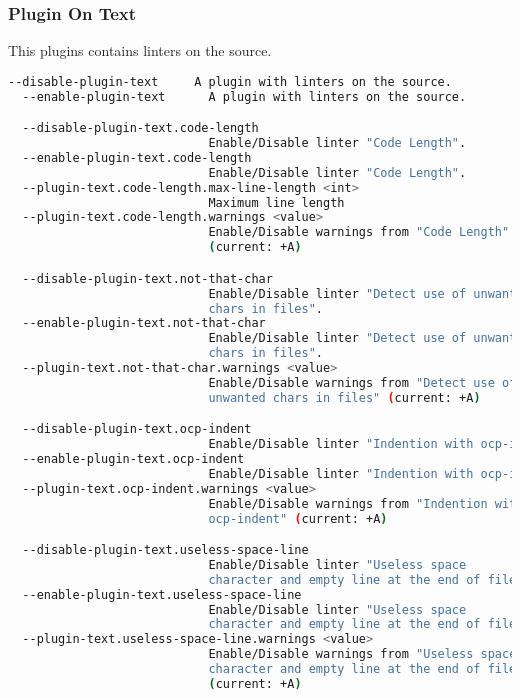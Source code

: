 \subsubsection*{Plugin On Text}
This plugins contains linters on the source.

\begin{lstlisting}[language=bash,basicstyle=\tt\small,showspaces=false,showstringspaces=false]
  --disable-plugin-text     A plugin with linters on the source.
  --enable-plugin-text      A plugin with linters on the source.

  --disable-plugin-text.code-length  
                            Enable/Disable linter "Code Length".
  --enable-plugin-text.code-length  
                            Enable/Disable linter "Code Length".
  --plugin-text.code-length.max-line-length <int> 
                            Maximum line length
  --plugin-text.code-length.warnings <value> 
                            Enable/Disable warnings from "Code Length" 
                            (current: +A)

  --disable-plugin-text.not-that-char  
                            Enable/Disable linter "Detect use of unwanted 
                            chars in files".
  --enable-plugin-text.not-that-char  
                            Enable/Disable linter "Detect use of unwanted 
                            chars in files".
  --plugin-text.not-that-char.warnings <value> 
                            Enable/Disable warnings from "Detect use of 
                            unwanted chars in files" (current: +A)

  --disable-plugin-text.ocp-indent  
                            Enable/Disable linter "Indention with ocp-indent".
  --enable-plugin-text.ocp-indent  
                            Enable/Disable linter "Indention with ocp-indent".
  --plugin-text.ocp-indent.warnings <value> 
                            Enable/Disable warnings from "Indention with
                            ocp-indent" (current: +A)

  --disable-plugin-text.useless-space-line  
                            Enable/Disable linter "Useless space 
                            character and empty line at the end of file".
  --enable-plugin-text.useless-space-line  
                            Enable/Disable linter "Useless space 
                            character and empty line at the end of file".
  --plugin-text.useless-space-line.warnings <value> 
                            Enable/Disable warnings from "Useless space
                            character and empty line at the end of file."
                            (current: +A)
\end{lstlisting}

